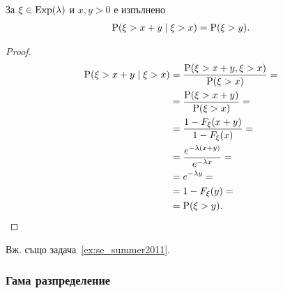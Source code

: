 \documentclass[numbers=endperiod, bibliography=totocnumbered]{scrartcl}
\begin{document}
\begin{theorem}\label{thm:memorylessness}
  За \( \xi \in \operatorname{Exp}(\lambda) \) и \( x, y > 0 \) е изпълнено
  \begin{align*}
    \operatorname{P}(\xi > x + y \mid \xi > x) = \operatorname{P}(\xi > y).
  \end{align*}
\end{theorem}
\begin{proof}
  \begin{align*}
    \operatorname{P}(\xi > x + y \mid \xi > x)
    &=
    \frac {\operatorname{P}(\xi > x + y, \xi > x)} {\operatorname{P}(\xi > x)}
    = \\ &=
    \frac {\operatorname{P}(\xi > x + y)} {\operatorname{P}(\xi > x)}
    = \\ &=
    \frac {1-F_\xi(x+y)} {1-F_\xi(x)}
    = \\ &=
    \frac {e^{-\lambda(x+y)}} {e^{-\lambda x}}
    = \\ &=
    e^{-\lambda y}
    = \\ &=
    1-F_\xi(y)
    = \\ &=
    \operatorname{P}(\xi > y).
  \end{align*}
\end{proof}

Вж. също задача~\ref{ex:se_summer2011}.

\subsubsection{Гама разпределение}\label{dist:gamma}
\end{document}
